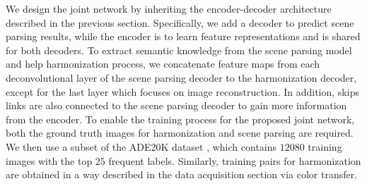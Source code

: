 \documentclass[10pt,twocolumn,letterpaper]{article}
\begin{document}
{}
%
We design the joint network by inheriting the encoder-decoder architecture described in the previous section.
%
Specifically, we add a decoder to predict scene parsing results, while the encoder is to learn feature representations and is shared for both decoders.
%
To extract semantic knowledge from the scene parsing model and help harmonization process, we concatenate feature maps from each deconvolutional layer of the scene parsing decoder to the harmonization decoder, except for the last layer which focuses on image reconstruction.
%
In addition, skips links \cite{Long_CVPR_2015} are also connected to the scene parsing decoder to gain more information from the encoder.
%
{}
%
To enable the training process for the proposed joint network, both the ground truth images for harmonization and scene parsing are required.
%
We then use a subset of the ADE20K dataset \cite{Zhou_corr_2016}, which contains $12080$ training images with the top $25$ frequent labels.
%
Similarly, training pairs for harmonization are obtained in a way described in the data acquisition section via color transfer.
%
\end{document}
